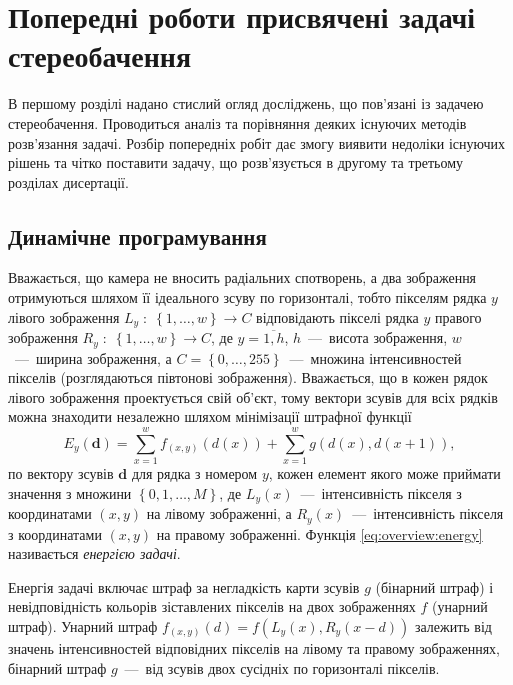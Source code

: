 \chapter{Попередні роботи присвячені задачі стереобачення}

В першому розділі надано стислий огляд досліджень,
що пов'язані із задачею стереобачення.
Проводиться аналіз та порівняння деяких існуючих методів розв'язання задачі.
Розбір попередніх робіт дає змогу виявити недоліки
існуючих рішень та чітко поставити задачу,
що розв'язується в другому та третьому розділах дисертації.

\section{Динамічне програмування}

Вважається, що камера не вносить радіальних спотворень,
а два зображення отримуються шляхом її ідеального зсуву по горизонталі,
тобто пікселям рядка $y$ лівого зображення
$L_y \; : \; \left\{ 1, \dotsc, w \right\} \to C$
відповідають пікселі рядка $y$
правого зображення $R_y \; : \; \left\{ 1, \dotsc, w \right\} \to C$,
де $y = \overline{1, h}$, $h$~---~висота зображення, $w$~---~ширина зображення,
а $C = \left\{ 0, \dotsc, 255 \right\}$~---~множина інтенсивностей пікселів
(розглядаються півтонові зображення).
Вважається, що в кожен рядок лівого зображення проектується свій об'єкт,
тому вектори зсувів для всіх рядків можна знаходити незалежно шляхом
мінімізації штрафної функції
\begin{equation}\label{eq:overview:energy}
    E_y \left(\pmb{d} \right)
    = \sum \limits_{x = 1}^{w}
        f_{\left( x, y \right)} \left( d \left( x \right) \right)
    + \sum \limits_{x = 1}^{w}
        g \left(d \left(x \right), d \left( x + 1 \right) \right),
\end{equation}
по вектору зсувів $\pmb{d}$ для рядка з номером $y$,
кожен елемент якого може приймати значення з множини
$\left\{ 0, 1, \dotsc, M \right\}$,
де $L_y \left( x \right)$~---~інтенсивність пікселя з координатами
$ \left(x, y \right)$ на лівому зображенні,
а $R_y \left( x \right)$~---~інтенсивність пікселя з координатами
$\left( x, y \right)$ на правому зображенні.
Функція \eqref{eq:overview:energy} називається \textit{енергією задачі}.

Енергія задачі включає штраф за негладкість карти зсувів $g$ (бінарний штраф)
і невідповідність кольорів зіставлених пікселів на двох зображеннях $f$
(унарний штраф).
Унарний штраф
$f_{\left( x, y \right)} \left( d \right) = f \left(
    L_y \left(x \right),
    R_y \left( x - d \right)
\right)$ залежить від значень
інтенсивностей відповідних пікселів на лівому та правому зображеннях,
бінарний штраф $g$~---~від зсувів двох сусідніх по горизонталі пікселів.

